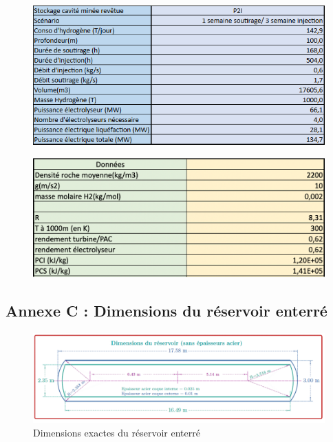 \documentclass[11pt,french,a4paper]{article}
\begin{document}
\begin{figure}
\centering
\begin{minipage}{.5\textwidth}
  \centering
  \includegraphics[width=0.9\linewidth]{image/annexe/config_cavite_minee/c7.png}
  \label{fig:test1}
\end{minipage}%
\begin{minipage}{.5\textwidth}
  \centering
  \includegraphics[width=0.9\linewidth]{image/annexe/config_cavite_minee/donnes.png}
  \label{fig:test2}
\end{minipage}
\end{figure}

\FloatBarrier
\subsection*{Annexe C : Dimensions du réservoir enterré}

\begin{figure}[h]
\centering
\includegraphics[width=0.8\linewidth]{image/annexe/reservoir_ent/dimReservoir.png}
\caption{Dimensions exactes du réservoir enterré}
\end{figure}
\end{document}
